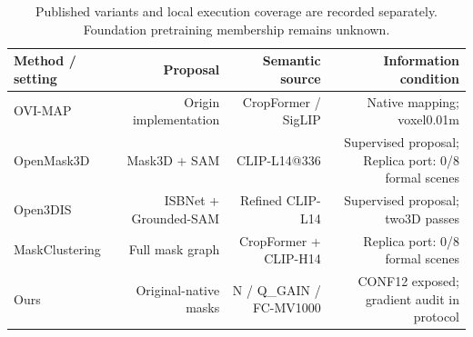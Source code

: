 \begin{table}[t]
\centering
\small
\caption{Published variants and local execution coverage are recorded separately. Foundation pretraining membership remains unknown.}
\label{tab:benchmark-s1}
\begin{tabular}{lrrr}
\toprule
Method / setting & Proposal & Semantic source & Information condition \\
\midrule
OVI-MAP & Origin implementation & CropFormer / SigLIP & Native mapping; voxel0.01m \\
OpenMask3D & Mask3D + SAM & CLIP-L14@336 & Supervised proposal; Replica port: 0/8 formal scenes \\
Open3DIS & ISBNet + Grounded-SAM & Refined CLIP-L14 & Supervised proposal; two3D passes \\
MaskClustering & Full mask graph & CropFormer + CLIP-H14 & Replica port: 0/8 formal scenes \\
Ours & Original-native masks & N / Q\_GAIN / FC-MV1000 & CONF12 exposed; gradient audit in protocol \\
\bottomrule
\end{tabular}
\end{table}

